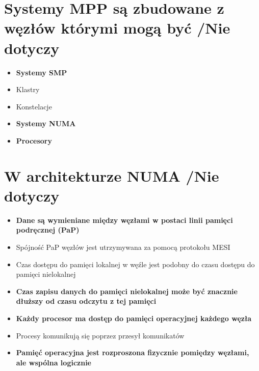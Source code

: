 \documentclass[a4paper,twoside]{article}
\begin{document}
\section{Systemy MPP są zbudowane z węzłów którymi mogą być {\small /Nie dotyczy}}
	\begin{itemize}
    \item \textbf{Systemy SMP}
    \item Klastry
    \item Konstelacje
    \item \textbf{Systemy NUMA}
    \item \textbf{Procesory}
    \end{itemize}

\section{W architekturze NUMA {\small /Nie dotyczy}}
	\begin{itemize}
    \item \textbf{Dane są wymieniane między węzłami w postaci linii pamięci podręcznej (PaP)}
    \item Spójność PaP węzłów jest utrzymywana za pomocą protokołu MESI
    \item Czas dostępu do pamięci lokalnej w węźle jest podobny do czasu dostępu do pamięci nielokalnej
    \item \textbf{Czas zapisu danych do pamięci nielokalnej może być znacznie dłuższy od czasu odczytu z tej pamięci}
    \item \textbf{Każdy procesor ma dostęp do pamięci operacyjnej każdego węzła}
    \item Procesy komunikują się poprzez przesył komunikatów
    \item \textbf{Pamięć operacyjna jest rozproszona fizycznie pomiędzy węzłami, ale wspólna logicznie}
    \end{itemize}
\end{document}
